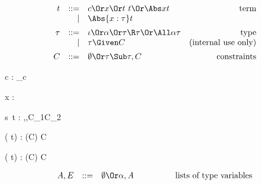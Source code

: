 \documentclass{amsart}
\begin{document}
{\begin{minipage}{\LeftWidth}
\bigbreak




\vfil
\end{minipage}
\begin{minipage}{\RightWidth}
\renewenvironment{syntax}{\[\begin{array}{rrlr}}{\end{array}\]}
\def\Separate{\vspace{0.4cm}}

\small
\begin{syntax}
t&::=& c \Or x \Or t~t \Or \Abs x t
&\mbox{term}\\
&|& \Abs {x : \tau} t
\OK
\tau &::=& \iota \Or \alpha \Or \tau \R \tau 
\Or \All\alpha\tau&\mbox{type}\\
&|&\tau\Given C&\mbox{(internal use only)}
\OK
C&::=&\emptyset \Or \tau\Sub\tau,C&\mbox{constraints}
\end{syntax}

\Separate

\infrule[CT-Con]
{}
{\Gamma\vdash c : \tau_c \Given \emptyset}

{\Gamma\vdash x : \tau \Given \emptyset}

{\Gamma\vdash s~t : \beta \Given
\sigma\Sub\alpha\R\beta,\tau\Sub\alpha,C_1\cup C_2}

{\Gamma\vdash ( t) :
(\alpha\R\tau\Given C) \Given C}

{\Gamma\vdash ( t) :
(\sigma\R\tau\Given C) \Given C}

\Separate

\begin{syntax}
A,E &::=&\emptyset \Or \alpha,A &\qquad\qquad\mbox{lists of type variables}
\end{syntax}


\end{minipage}}
\end{document}
